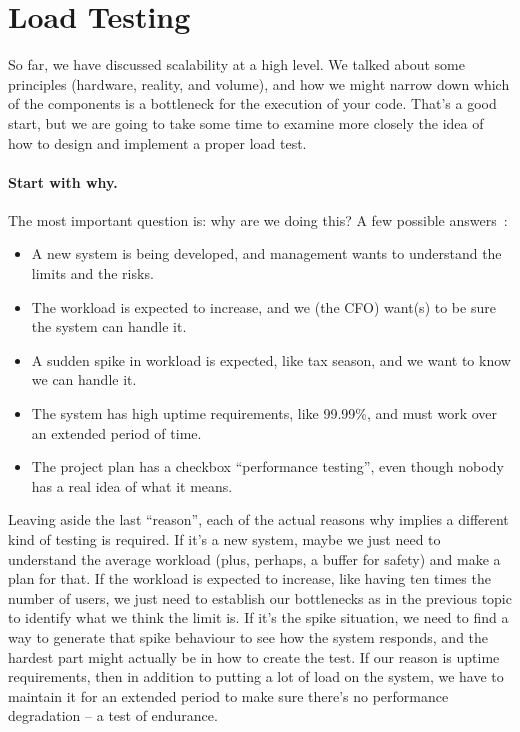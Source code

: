 




\section*{Load Testing}

So far, we have discussed scalability at a high level. We talked about some principles (hardware, reality, and volume), and how we might narrow down which of the components is a bottleneck for the execution of your code. That's a good start, but we are going to take some time to examine more closely the idea of how to design and implement a proper load test. 

\paragraph{Start with why.} The most important question is: why are we doing this? A few possible answers~\cite{hitchhiking}:
\begin{itemize}
	\item A new system is being developed, and management wants to understand the limits and the risks.
	\item The workload is expected to increase, and we (the CFO) want(s) to be sure the system can handle it.
	\item A sudden spike in workload is expected, like tax season, and we want to know we can handle it.
	\item The system has high uptime requirements, like 99.99\%, and must work over an extended period of time. 
	\item The project plan has a checkbox ``performance testing'', even though nobody has a real idea of what it means.
\end{itemize}

Leaving aside the last ``reason'', each of the actual reasons why implies a different kind of testing is required. If it's a new system, maybe we just need to understand the average workload (plus, perhaps, a buffer for safety) and make a plan for that. If the workload is expected to increase, like having ten times the number of users, we just need to establish our bottlenecks as in the previous topic to identify what we think the limit is. If it's the spike situation, we need to find a way to generate that spike behaviour to see how the system responds, and the hardest part might actually be in how to create the test. If our reason is uptime requirements, then in addition to putting a lot of load on the system, we have to maintain it for an extended period to make sure there's no performance degradation -- a test of endurance.

